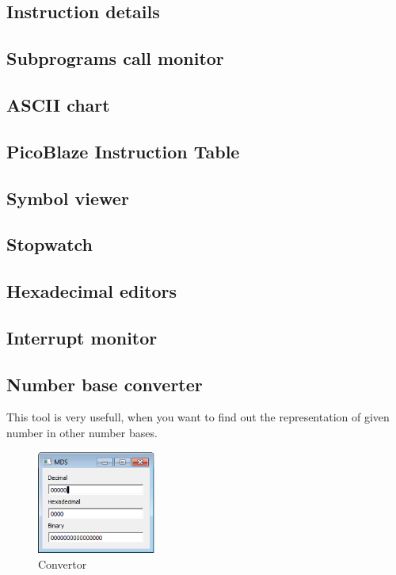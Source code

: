 \subsection{Instruction details}
\subsection{Subprograms call monitor}
\subsection{ASCII chart}
\subsection{PicoBlaze Instruction Table}
\subsection{Symbol viewer}
\subsection{Stopwatch}

\subsection{Hexadecimal editors }
\subsection{Interrupt monitor}

\subsection{Number base converter}
This tool is very usefull, when you want to find out the representation of given number in other
number bases.

        \begin{figure}
                \centering
                \includegraphics[width=110pt]{img/convertor.png}
                \caption{Convertor}
        \end{figure}

